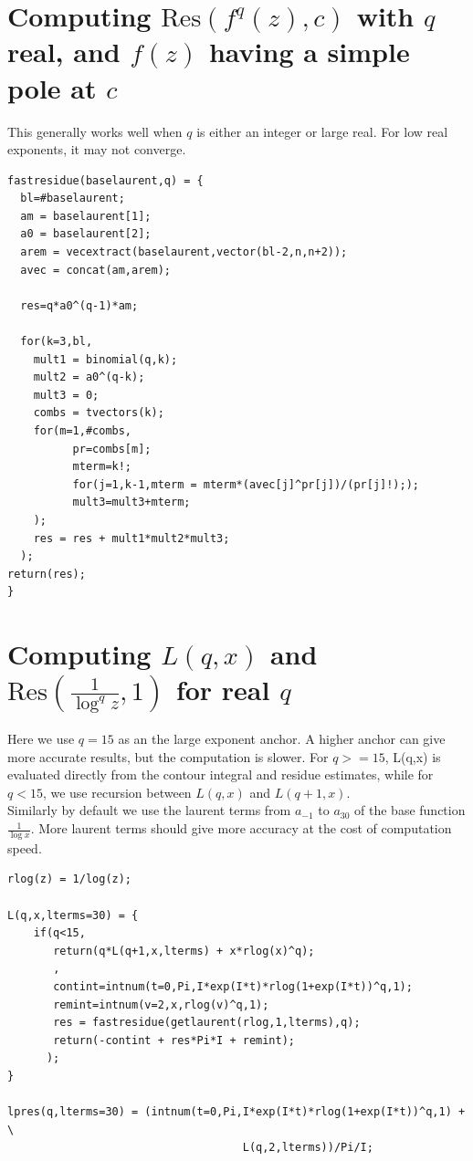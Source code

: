 \documentclass[a4paper,11pt,twoside]{amsart}
\newcommand\Res{\mathrm{Res}}
\begin{document}
\section{Computing $\Res(f^{q}(z),c)$ with $q$ real, and $f(z)$ having a simple pole at $c$}

This generally works well when $q$ is either an integer or large real. For low real exponents, it may not converge.
  
\begin{verbatim}
fastresidue(baselaurent,q) = {
  bl=#baselaurent;
  am = baselaurent[1];
  a0 = baselaurent[2];
  arem = vecextract(baselaurent,vector(bl-2,n,n+2));
  avec = concat(am,arem);

  res=q*a0^(q-1)*am;

  for(k=3,bl,
    mult1 = binomial(q,k);
    mult2 = a0^(q-k);
    mult3 = 0;
    combs = tvectors(k);
    for(m=1,#combs,
          pr=combs[m];
          mterm=k!;
          for(j=1,k-1,mterm = mterm*(avec[j]^pr[j])/(pr[j]!););
          mult3=mult3+mterm;
    );
    res = res + mult1*mult2*mult3;
  );
return(res);
}
\end{verbatim}

\section{Computing $L(q,x)$ and $\Res(\frac{1}{\log^{q} z}, 1)$ for real $q$}
Here we use $q=15$ as an the large exponent anchor. A higher anchor can give more accurate results, but the computation is slower. For $q>=15$, L(q,x) is evaluated directly from the contour integral and residue estimates, while for $q<15$, we use recursion between $L(q,x)$ and $L(q+1,x)$.\\
Similarly by default we use the laurent terms from $a_{-1}$ to $a_{30}$ of the base function $\frac{1}{\log x}$. More laurent terms should give more accuracy at the cost of computation speed.

\begin{verbatim}
rlog(z) = 1/log(z);

L(q,x,lterms=30) = {
    if(q<15,
       return(q*L(q+1,x,lterms) + x*rlog(x)^q);
       ,
       contint=intnum(t=0,Pi,I*exp(I*t)*rlog(1+exp(I*t))^q,1);
       remint=intnum(v=2,x,rlog(v)^q,1);
       res = fastresidue(getlaurent(rlog,1,lterms),q);
       return(-contint + res*Pi*I + remint);
      );
}

lpres(q,lterms=30) = (intnum(t=0,Pi,I*exp(I*t)*rlog(1+exp(I*t))^q,1) + \
                                    L(q,2,lterms))/Pi/I;
\end{verbatim}
\end{document}
